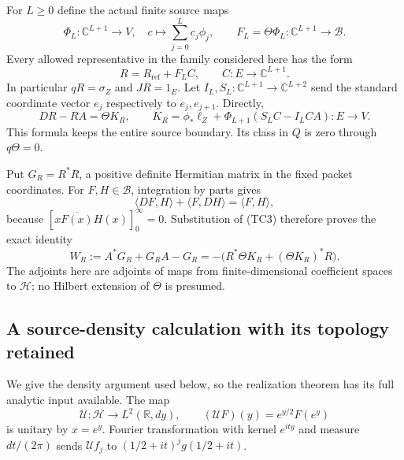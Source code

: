 For \(L\geq0\) define the actual finite source maps
\[
 \Phi_L:\mathbb C^{L+1}\longrightarrow V,\quad
       c\longmapsto\sum_{j=0}^Lc_j\phi_j,\qquad
 F_L=\Theta\Phi_L:\mathbb C^{L+1}\longrightarrow\mathscr B.
\]
Every allowed representative in the family considered here has the form
\[
 R=R_{\mathrm{ref}}+F_LC,\qquad C:E\longrightarrow\mathbb C^{L+1}.
 \tag{TC2}
\]
In particular \(qR=\sigma_Z\) and \(JR=1_E\).
Let \(I_L,S_L:\mathbb C^{L+1}\to\mathbb C^{L+2}\) send the standard
coordinate vector \(e_j\) respectively to \(e_j,e_{j+1}\).  Directly,
\[
 DR-RA=\Theta K_R,\qquad
 K_R=\phi_*\ell_Z+\Phi_{L+1}(S_LC-I_LCA):E\longrightarrow V.
 \tag{TC3}
\]
This formula keeps the entire source boundary.  Its class in \(Q\) is
zero through \(q\Theta=0\).

Put \(G_R=R^*R\), a positive definite Hermitian matrix in the fixed packet
coordinates.  For \(F,H\in\mathscr B\), integration by parts gives
\[
 \langle DF,H\rangle+\langle F,DH\rangle=\langle F,H\rangle,
\]
because \([x\overline{F(x)}H(x)]_0^\infty=0\).  Substitution of (TC3)
therefore proves the exact identity
\[
 W_R:=A^*G_R+G_RA-G_R
   =-\bigl(R^*\Theta K_R+(\Theta K_R)^*R\bigr).
 \tag{TC4}
\]
The adjoints here are adjoints of maps from finite-dimensional coefficient
spaces to \(\mathcal H\); no Hilbert extension of \(\Theta\) is presumed.

\subsection{A source-density calculation with its topology retained}

We give the density argument used below, so the realization theorem has
its full analytic input available.  The map
\[
 \mathcal U:\mathcal H\longrightarrow L^2(\mathbb R,dy),\qquad
 (\mathcal UF)(y)=e^{y/2}F(e^y)
\]
is unitary by \(x=e^y\).  Fourier transformation with kernel \(e^{ity}\)
and measure \(dt/(2\pi)\) sends \(\mathcal Uf_j\) to
\((1/2+it)^j g(1/2+it)\).

